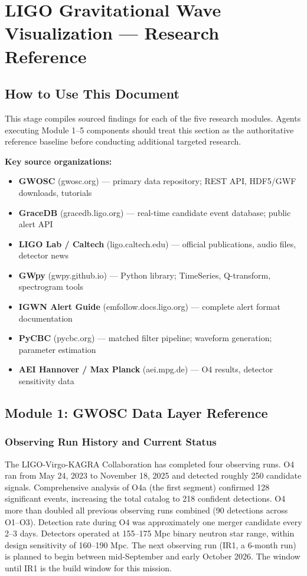 \documentclass[11pt,letterpaper]{article}
\begin{document}
\section{LIGO Gravitational Wave Visualization --- Research Reference}

\subsection{How to Use This Document}

This stage compiles sourced findings for each of the five research modules. Agents executing Module 1--5 components should treat this section as the authoritative reference baseline before conducting additional targeted research.

\textbf{Key source organizations:}
\begin{itemize}[noitemsep]
  \item \textbf{GWOSC} (gwosc.org) --- primary data repository; REST API, HDF5/GWF downloads, tutorials
  \item \textbf{GraceDB} (gracedb.ligo.org) --- real-time candidate event database; public alert API
  \item \textbf{LIGO Lab / Caltech} (ligo.caltech.edu) --- official publications, audio files, detector news
  \item \textbf{GWpy} (gwpy.github.io) --- Python library; TimeSeries, Q-transform, spectrogram tools
  \item \textbf{IGWN Alert Guide} (emfollow.docs.ligo.org) --- complete alert format documentation
  \item \textbf{PyCBC} (pycbc.org) --- matched filter pipeline; waveform generation; parameter estimation
  \item \textbf{AEI Hannover / Max Planck} (aei.mpg.de) --- O4 results, detector sensitivity data
\end{itemize}

\subsection{Module 1: GWOSC Data Layer Reference}

\subsubsection{Observing Run History and Current Status}

The LIGO-Virgo-KAGRA Collaboration has completed four observing runs. O4 ran from May 24, 2023 to November 18, 2025 and detected roughly 250 candidate signals. Comprehensive analysis of O4a (the first segment) confirmed 128 significant events, increasing the total catalog to 218 confident detections. O4 more than doubled all previous observing runs combined (90 detections across O1--O3). Detection rate during O4 was approximately one merger candidate every 2--3 days. Detectors operated at 155--175 Mpc binary neutron star range, within design sensitivity of 160--190 Mpc. The next observing run (IR1, a 6-month run) is planned to begin between mid-September and early October 2026. The window until IR1 is the build window for this mission.
\end{document}
